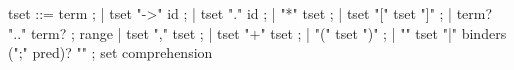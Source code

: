 \begin{syntax}
  tset ::= term ;
       | tset "->" id ;
       | tset "." id  ;
       | "*" tset ;
       | tset "[" tset "]" ;
       | term? ".." term? ; range
       | tset "," tset ;
       | tset "+" tset ;
       | "(" tset ")" ;
       | "{" tset "|" binders (";" pred)? "}" ; set comprehension
\end{syntax}


